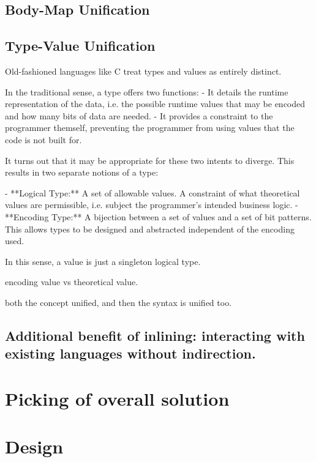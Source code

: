 \documentclass[12pt,a4paper,twoside]{report}
\begin{document}
\subsection{Body-Map Unification}



\subsection{Type-Value Unification}

Old-fashioned languages like C treat types and values as entirely distinct.

In the traditional sense, a type offers two functions:
- It details the runtime representation of the data, i.e. the possible runtime values that may be encoded and how many bits of data are needed.
- It provides a constraint to the programmer themself, preventing the programmer from using values that the code is not built for.

It turns out that it may be appropriate for these two intents to diverge. This results in two separate notions of a type:

- **Logical Type:** A set of allowable values. A constraint of what theoretical values are permissible, i.e. subject the programmer's intended business logic.
- **Encoding Type:** A bijection between a set of values and a set of bit patterns. This allows types to be designed and abstracted independent of the encoding used.

In this sense, a value is just a singleton logical type.



encoding value vs theoretical value.

both the concept unified, and then the syntax is unified too.

\subsection{Additional benefit of inlining: interacting with existing languages without indirection.}

\section{Picking of overall solution}

\section{Design}
\end{document}
